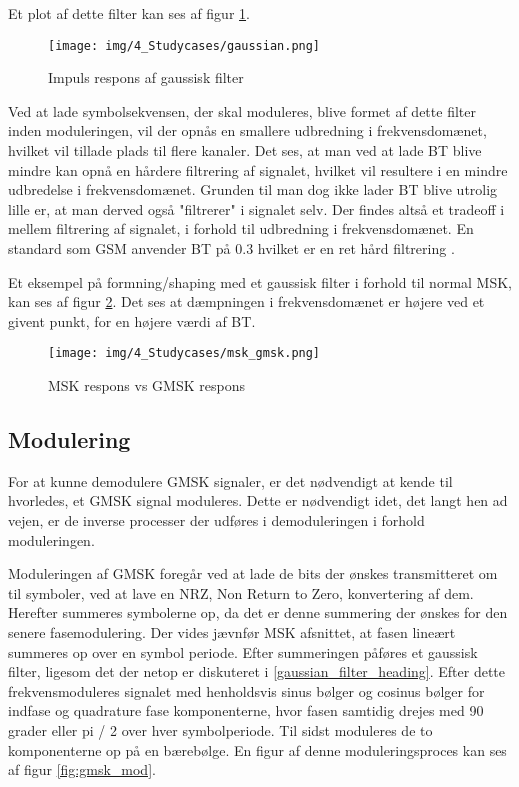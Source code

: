 \begin{appendices}
Et plot af dette filter kan ses af figur \ref{fig:gaussian}.

\begin{figure}[H]
	\centering{}
	\texttt{[image: img/4\_Studycases/gaussian.png]}
	\caption{Impuls respons af gaussisk filter}
	\label{fig:gaussian}
\end{figure} 

Ved at lade symbolsekvensen, der skal moduleres, blive formet af dette filter inden moduleringen, vil der opnås en smallere udbredning i frekvensdomænet, hvilket vil tillade plads til flere kanaler. Det ses, at man ved at lade BT blive mindre kan opnå en hårdere filtrering af signalet, hvilket vil resultere i en mindre udbredelse i frekvensdomænet. Grunden til man dog ikke lader BT blive utrolig lille er, at man derved også "filtrerer" i signalet selv. Der findes altså et tradeoff i mellem filtrering af signalet, i forhold til udbredning i frekvensdomænet. En standard som GSM anvender BT på 0.3 hvilket er en ret hård filtrering \cite{GSM-GMSK}.

Et eksempel på formning/shaping med et gaussisk filter i forhold til normal MSK, kan ses af figur \ref{fig:msk_gmsk}. Det ses at dæmpningen i frekvensdomænet er højere ved et givent punkt, for en højere værdi af BT.

\begin{figure}[H]
	\centering{}
	\texttt{[image: img/4\_Studycases/msk\_gmsk.png]}
	\caption{MSK respons vs GMSK respons }
	\label{fig:msk_gmsk}
\end{figure} 

\subsection{Modulering} \label{modelering}
For at kunne demodulere GMSK signaler, er det nødvendigt at kende til hvorledes, et GMSK signal moduleres. Dette er nødvendigt idet, det langt hen ad vejen, er de inverse processer der udføres i demoduleringen i forhold moduleringen.

Moduleringen af GMSK foregår ved at lade de bits der ønskes transmitteret om til symboler, ved at lave en NRZ, Non Return to Zero, konvertering af dem. Herefter summeres symbolerne op, da det er denne summering der ønskes for den senere fasemodulering. Der vides jævnfør MSK afsnittet, at fasen lineært summeres op over en symbol periode. Efter summeringen påføres et gaussisk filter, ligesom det der netop er diskuteret i \ref{gaussian_filter_heading}. Efter dette frekvensmoduleres signalet med henholdsvis sinus bølger og cosinus bølger for indfase og quadrature fase komponenterne, hvor fasen samtidig drejes med 90 grader eller pi / 2 over hver symbolperiode. Til sidst moduleres de to komponenterne op på en bærebølge. En figur af denne moduleringsproces kan ses af figur \ref{fig:gmsk_mod}.


\end{appendices}
